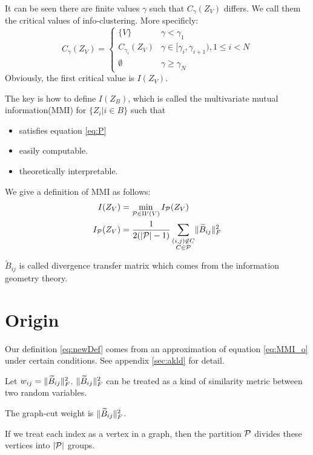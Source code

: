 \documentclass{article}
\begin{document}
It can be seen there are finite values $\gamma$ such that $C_{\gamma}(Z_V)$ differs.
We call them the critical values of info-clustering.
More specificly:
\begin{equation*}
C_{\gamma}(Z_V) = \begin{cases}
\{V\} & \gamma < \gamma_1 \\
C_{\gamma_i}(Z_V) & \gamma \in [\gamma_i, \gamma_{i+1}), 1\leq i < N \\
\emptyset & \gamma \geq \gamma_N
\end{cases}
\end{equation*}
Obviously, the first critical value is $I(Z_V)$.

The key is how to define $I(Z_B)$, which is called the multivariate mutual information(MMI) for $\{Z_i | i
\in B\}$ such that
\begin{itemize}
\item satisfies equation \eqref{eq:P}
\item easily computable.
\item theoretically interpretable.
\end{itemize}

We give a definition of MMI as follows:
\begin{align}
I(Z_V) & = \min_{\mathcal{P} \in \Pi'(V)} I_{\mathcal{P}}(Z_V) \\
\label{eq:newDef}  I_{\mathcal{P}}(Z_V) & = {1 \over 2( \abs{\mathcal{P}} - 1) } \sum_{\substack{(i,j) \not\in C\\ C\in \mathcal{P}}} \norm{\widetilde{B}_{ij}}_F^2
\end{align}

$\widetilde{B}_{ij}$ is called divergence transfer matrix which comes from the information geometry theory.

\section{Origin}
Our definition \eqref{eq:newDef} comes from an approximation of equation \eqref{eq:MMI_o} under certain conditions. See appendix \ref{sec:akld} for detail.

Let $w_{ij} = \norm{\widetilde{B}_{ij}}_F^2$.
$\norm{\widetilde{B}_{ij}}_F^2$ can be treated as a kind of similarity metric between two random variables.

The graph-cut weight is $\norm{\widetilde{B}_{ij}}_F^2$.

If we treat each index as a vertex in a graph, then the partition $\P$ divides these vertices into $\abs{\P}$ groups. 
\end{document}
